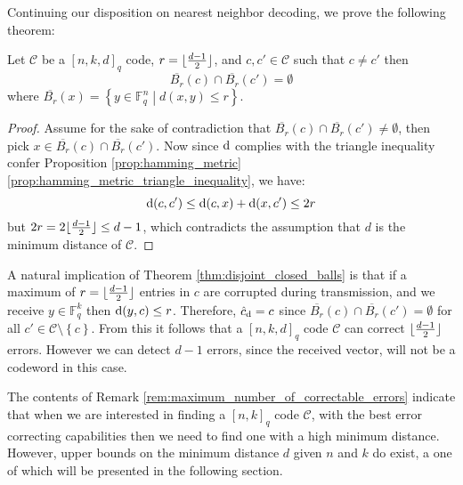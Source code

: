 Continuing our disposition on nearest neighbor decoding, we prove the following theorem:
\begin{theorem}\label{thm:disjoint_closed_balls}
  Let $\mathcal{C}$ be a $[n, k, d]_{q}$ code, $r = \lfloor\frac{d-1}{2}\rfloor$, and $c, c' \in \mathcal{C}$ such that $c \neq c'$ then
  \begin{equation*}
     \overline{B_{r}}(c) \cap \overline{B_r}(c') = \emptyset
  \end{equation*}
  where $\overline{B_{r}}(x) = \left\{y \in \mathbb{F}_q^n \middle| d(x, y) \leq r\right\}$.
\end{theorem}
\begin{proof}
  Assume for the sake of contradiction that $\overline{B_{r}}(c) \cap \overline{B_r}(c') \neq \emptyset$, then pick $x \in \overline{B_{r}}(c) \cap \overline{B_r}(c')$. Now since $\mathrm{d}$ complies with the triangle inequality confer Proposition \ref{prop:hamming_metric}\ref{prop:hamming_metric_triangle_inequality}, we have:
  \begin{equation*}
    \mathrm{d}(c, c') \leq \mathrm{d}(c, x) + \mathrm{d}(x,c') \leq 2r
  \end{equation*}
  but $2r = 2 \lfloor\frac{d-1}{2}\rfloor \leq d - 1$, which contradicts the assumption that $d$ is the minimum distance of $\mathcal{C}$.
\end{proof}

\begin{remark}\label{rem:maximum_number_of_correctable_errors}
A natural implication of Theorem \ref{thm:disjoint_closed_balls} is that if a maximum of $r = \lfloor\frac{d-1}{2}\rfloor$ entries in $c$ are corrupted during transmission, and we receive $y \in \mathbb{F}^k_q$ then $\mathrm{d}(y, c) \leq r$. Therefore, $\hat{c}_{\mathrm{d}} = c$ since $\overline{B_{r}}(c) \cap \overline{B_r}(c') = \emptyset$ for all $c' \in \mathcal{C} \setminus \left\{c\right\}$. From this it follows that a $[n, k, d]_{q}$ code $\mathcal{C}$ can correct $\lfloor\frac{d - 1}{2}\rfloor$ errors. However we can detect $d-1$ errors, since the received vector, will not be a codeword in this case.
\end{remark}

The contents of Remark \ref{rem:maximum_number_of_correctable_errors} indicate that when we are interested in finding a $[n, k]_{q}$ code $\mathcal{C}$, with the best error correcting capabilities then we need to find one with a high minimum distance.
However, upper bounds on the minimum distance $d$ given $n$ and $k$ do exist, a one of which will be presented in the following section.

